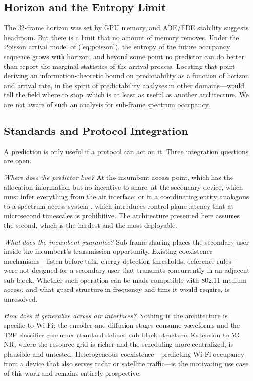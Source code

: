 \documentclass[lettersize,journal]{IEEEtran}
\begin{document}
\subsection{\textbf{Horizon and the Entropy Limit}}
The 32-frame horizon was set by GPU memory, and ADE/FDE stability
suggests headroom. But there is a limit that no amount of memory
removes. Under the Poisson arrival model of (\ref{eq:poisson}), the
entropy of the future occupancy sequence grows with horizon, and beyond
some point no predictor can do better than report the marginal statistics
of the arrival process. Locating that point---deriving an
information-theoretic bound on predictability as a function of horizon
and arrival rate, in the spirit of predictability analyses in other
domains---would tell the field where to stop, which is at least as
useful as another architecture. We are not aware of such an analysis for
sub-frame spectrum occupancy.

\subsection{\textbf{Standards and Protocol Integration}}
A prediction is only useful if a protocol can act on it. Three
integration questions are open.

\emph{Where does the predictor live?} At the incumbent access point,
which has the allocation information but no incentive to share; at the
secondary device, which must infer everything from the air interface; or
in a coordinating entity analogous to a spectrum access system
\cite{FCC2015CBRS}, which introduces control-plane latency that at
microsecond timescales is prohibitive. The architecture presented here
assumes the second, which is the hardest and the most deployable.

\emph{What does the incumbent guarantee?} Sub-frame sharing places the
secondary user inside the incumbent's transmission opportunity. Existing
coexistence mechanisms---listen-before-talk, energy detection
thresholds, deference rules---were not designed for a secondary user
that transmits concurrently in an adjacent sub-block. Whether such
operation can be made compatible with 802.11 medium access, and what
guard structure in frequency and time it would require, is unresolved.

\emph{How does it generalize across air interfaces?} Nothing in the
architecture is specific to Wi-Fi; the encoder and diffusion stages
consume waveforms and the T2F classifier consumes standard-defined
sub-block structure. Extension to 5G NR, where the resource grid is
richer and the scheduling more centralized, is plausible and untested.
Heterogeneous coexistence---predicting Wi-Fi occupancy from a device
that also serves radar or satellite traffic---is the motivating use case
of this work and remains entirely prospective.
\end{document}
